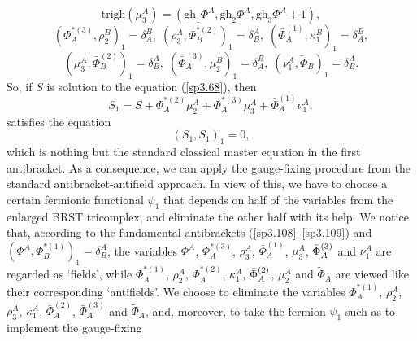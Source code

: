 \documentclass[a4paper,12pt]{article}
\begin{document}
\begin{equation}
\mathrm{trigh}\left( \mu _{3}^{A}\right) =\left( \mathrm{gh}_{1}\Phi ^{A},%
\mathrm{gh}_{2}\Phi ^{A},\mathrm{gh}_{3}\Phi ^{A}+1\right) ,  \label{sp3.107}
\end{equation}
\begin{equation}
\left( \Phi _{A}^{*(3)},\rho _{2}^{B}\right) _{1}=\delta _{A}^{B},\;\left(
\rho _{3}^{A},\Phi _{B}^{*(2)}\right) _{1}=\delta _{B}^{A},\;\left( \bar{\Phi%
}_{A}^{(1)},\kappa _{1}^{B}\right) _{1}=\delta _{A}^{B},  \label{sp3.108}
\end{equation}
\begin{equation}
\left( \mu _{3}^{A},\bar{\Phi}_{B}^{(2)}\right) _{1}=\delta
_{B}^{A},\;\left( \bar{\Phi}_{A}^{(3)},\mu _{2}^{B}\right) _{1}=\delta
_{A}^{B},\;\left( \nu _{1}^{A},\tilde{\Phi}_{B}\right) _{1}=\delta _{B}^{A}.
\label{sp3.109}
\end{equation}
So, if $S$ is solution to the equation (\ref{sp3.68}), then 
\begin{equation}
S_{1}=S+\Phi _{A}^{*(2)}\mu _{2}^{A}+\Phi _{A}^{*(3)}\mu _{3}^{A}+\bar{\Phi}%
_{A}^{(1)}\nu _{1}^{A},  \label{sp3.109a}
\end{equation}
satisfies the equation 
\begin{equation}
\left( S_{1},S_{1}\right) _{1}=0,  \label{sp3.109b}
\end{equation}
which is nothing but the standard classical master equation in the first
antibracket. As a consequence, we can apply the gauge-fixing procedure from
the standard antibracket-antifield approach. In view of this, we have to
choose a certain fermionic functional $\psi _{1}$ that depends on half of
the variables from the enlarged BRST tricomplex, and eliminate the other
half with its help. We notice that, according to the fundamental
antibrackets (\ref{sp3.108}--\ref{sp3.109}) and $\left( \Phi ^{A},\Phi
_{B}^{*(1)}\right) _{1}=\delta _{B}^{A}$, the variables $\Phi ^{A}$, $\Phi
_{A}^{*(3)}$, $\rho _{3}^{A}$, $\bar{\Phi}_{A}^{(1)}$, $\mu _{3}^{A}$, $\bar{%
\Phi}_{A}^{(3)}$ and $\nu _{1}^{A}$ are regarded as `fields', while $\Phi
_{A}^{*(1)}$, $\rho _{2}^{A}$, $\Phi _{A}^{*(2)}$, $\kappa _{1}^{A}$, $\bar{%
\Phi}_{A}^{(2)}$, $\mu _{2}^{A}$ and $\tilde{\Phi}_{A}$ are viewed like
their corresponding `antifields'. We choose to eliminate the variables $\Phi
_{A}^{*(1)}$, $\rho _{2}^{A}$, $\rho _{3}^{A}$, $\kappa _{1}^{A}$, $\bar{\Phi%
}_{A}^{(2)}$, $\bar{\Phi}_{A}^{(3)}$ and $\tilde{\Phi}_{A}$, and, moreover,
to take the fermion $\psi _{1}$ such as to implement the gauge-fixing
\end{document}
